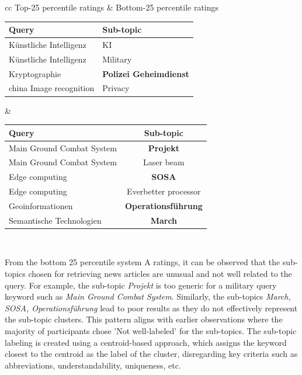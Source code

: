 \begin{center}
	\label{tab:queries_question_234}
	\begin{tabular}{ cc }   %
		Top-25 percentile ratings & Bottom-25 percentile ratings \\  
		\begin{tabularx}{.4\textwidth}{|Y|Y|}
			\hline
			Query  & Sub-topic \\
			\hline
			Künstliche Intelligenz & KI  \\
			\hline
			Künstliche Intelligenz & Military \\
			\hline
			Kryptographie & \textbf{Polizei Geheimdienst}\\
			\hline
			china Image recognition & Privacy \\
			\hline
		\end{tabularx}&  %
		\begin{tabularx}{.55\textwidth}{|Y|c|}
			\hline
			Query  & Sub-topic \\
			\hline
			Main Ground Combat System & \textbf{Projekt}  \\
			\hline
			Main Ground Combat System & Laser beam \\
			\hline
			Edge computing & \textbf{SOSA} \\
			\hline
			Edge computing & Everbetter processor \\
			\hline
			Geoinformationen & \textbf{Operationsführung} \\
			\hline
			Semantische Technologien & \textbf{March} \\
			\hline
		\end{tabularx}\\
	\end{tabular}
\end{center}

From the bottom 25 percentile system A ratings, it can be observed that the sub-topics chosen for retrieving news articles are unusual and not well related to the query. For example, the sub-topic \emph{Projekt} is too generic for a military query keyword such as \emph{Main Ground Combat System}. Similarly, the sub-topics \emph{March, SOSA, Operationsführung} lead to poor results as they do not effectively represent the sub-topic clusters. This pattern aligns with earlier observations where the majority of participants chose 'Not well-labeled' for the sub-topics. The sub-topic labeling is created using a centroid-based approach, which assigns the keyword closest to the centroid as the label of the cluster, disregarding key criteria such as abbreviations, understandability, uniqueness, etc.

